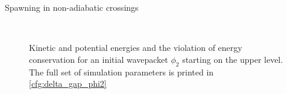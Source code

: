 \begin{chapter}{Spawning in non-adiabatic crossings}
\begin{figure}[h!]
  \centering
   \\
  \caption[Energies for a $\phi_2$ in an avoided crossing]{
  Kinetic and potential energies and the violation of energy conservation for an
  initial wavepacket $\phi_2$ starting on the upper level. The full set of simulation
  parameters is printed in \ref{cfg:delta_gap_phi2}
  \label{fig:basic_delta_gap_phi2_energies}
  }
\end{figure}




\end{chapter}
